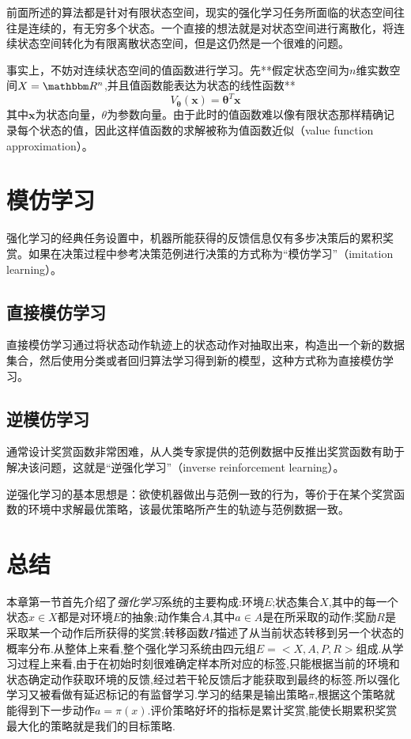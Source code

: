 前面所述的算法都是针对有限状态空间，现实的强化学习任务所面临的状态空间往往是连续的，有无穷多个状态。一个直接的想法就是对状态空间进行离散化，将连续状态空间转化为有限离散状态空间，但是这仍然是一个很难的问题。

事实上，不妨对连续状态空间的值函数进行学习。先**假定状态空间为$n$维实数空间$X=\mathbbm R^n$,并且值函数能表达为状态的线性函数**
\begin{equation}
V_{\mathbf \theta}(\mathbf x)=\mathbf\theta^T\mathbf x
\end{equation}
其中$\mathbf x$为状态向量，$\theta$为参数向量。由于此时的值函数难以像有限状态那样精确记录每个状态的值，因此这样值函数的求解被称为值函数近似（value function approximation）。

\section{模仿学习}

强化学习的经典任务设置中，机器所能获得的反馈信息仅有多步决策后的累积奖赏。如果在决策过程中参考决策范例进行决策的方式称为``模仿学习''（imitation learning）。

\subsection{直接模仿学习}

直接模仿学习通过将状态动作轨迹上的状态动作对抽取出来，构造出一个新的数据集合，然后使用分类或者回归算法学习得到新的模型，这种方式称为直接模仿学习。

\subsection{逆模仿学习}

通常设计奖赏函数非常困难，从人类专家提供的范例数据中反推出奖赏函数有助于解决该问题，这就是``逆强化学习''（inverse reinforcement learning）。

逆强化学习的基本思想是：欲使机器做出与范例一致的行为，等价于在某个奖赏函数的环境中求解最优策略，该最优策略所产生的轨迹与范例数据一致。

\section*{总结}

本章第一节首先介绍了\textit{强化学习}系统的主要构成:环境$E$;状态集合$X$,其中的每一个状态$x\in X$都是对环境$E$的抽象;动作集合$A$,其中$a\in A$是在所采取的动作;奖励$R$是采取某一个动作后所获得的奖赏;转移函数$P$描述了从当前状态转移到另一个状态的概率分布.从整体上来看,整个强化学习系统由四元组$E=<X,A,P,R>$组成.从学习过程上来看,由于在初始时刻很难确定样本所对应的标签,只能根据当前的环境和状态确定动作获取环境的反馈,经过若干轮反馈后才能获取到最终的标签.所以强化学习又被看做有延迟标记的有监督学习.学习的结果是输出策略$\pi$,根据这个策略就能得到下一步动作$a=\pi(x)$.评价策略好坏的指标是累计奖赏,能使长期累积奖赏最大化的策略就是我们的目标策略.

